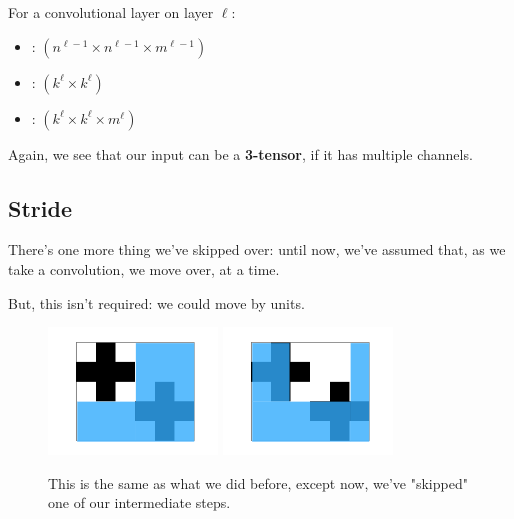         \begin{definition}
            For a convolutional layer on layer $\ell$:

            \begin{itemize}
                \item {}: $(n^{\ell-1} \times n^{\ell-1} \times m^{\ell-1})$
                \item {}: $(k^\ell \times k^\ell)$
                \item {}: $(k^\ell \times k^\ell \times m^\ell)$
            \end{itemize}
        \end{definition}

        Again, we see that our input can be a \textbf{3-tensor}, if it has multiple channels.


    \subsection{Stride}

        There's one more thing we've skipped over: until now, we've assumed that, as we take a convolution, we move over,  at a time.

        But, this isn't required: we could move by  units.

        \begin{figure}[H]
            \centering
            \includegraphics[width=45mm,scale=0.5]{images/convolutional_neural_networks_images/window.png}
            \includegraphics[width=45mm,scale=0.5]{images/convolutional_neural_networks_images/window3.png}
            
            \caption*{This is the same as what we did before, except now, we've "skipped" one of our intermediate steps.}
        \end{figure}

